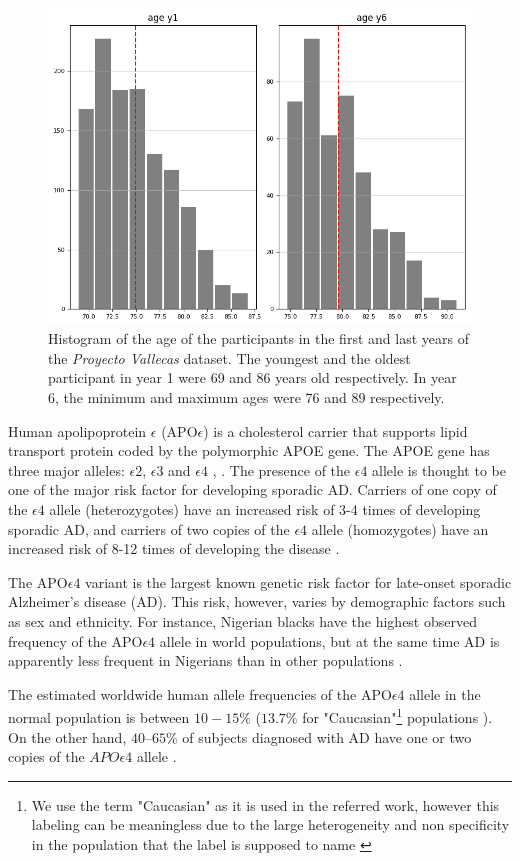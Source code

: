 \documentclass[11pt]{article}
\theoremstyle{definition}
\theoremstyle{remark}
\begin{document}
\begin{figure}[H]
        \centering
        \includegraphics[keepaspectratio, width=.6\linewidth]{figures/Fig_ages}
        \caption{Histogram of the age of the participants in the first and last years of the \emph{Proyecto Vallecas} dataset. The youngest and the oldest participant in year 1 were 69 and 86 years old respectively. In year 6, the minimum and maximum ages were 76 and 89 respectively.} 
        \label{fig:ages}
\end{figure}

Human apolipoprotein $\epsilon$ (APO$\epsilon$) is a cholesterol carrier that supports lipid transport protein coded by the polymorphic APOE gene. The APOE gene has three major alleles: $\epsilon2$, $\epsilon3$ and $\epsilon4$ \cite{mahley2000apolipoprotein}, \cite{hauser2011apolipoprotein}. The presence of the $\epsilon4$ allele is thought to be one of the major risk factor for developing sporadic AD. Carriers of one copy of the  $\epsilon4$ allele (heterozygotes) have an increased risk of 3-4 times of developing sporadic AD, and carriers of two copies of the $\epsilon4$ allele (homozygotes) have an increased risk of 8-12 times of developing the disease \cite{heffernan2016neurobiology}. 

The APO$\epsilon4$ variant is the largest known genetic risk factor for late-onset sporadic Alzheimer's disease (AD). This risk, however, varies by demographic factors such as sex and ethnicity. For instance, Nigerian blacks have the highest observed frequency of the APO$\epsilon4$ allele in world populations, but at the same time AD is apparently less frequent in Nigerians than in other populations \cite{sepehrnia1989genetic}.

The estimated worldwide human allele frequencies of the APO$\epsilon4$ allele in the normal population is between $10-15\%$\cite{myers1996apolipoprotein} ($13.7\%$ for "Caucasian"\footnote{We use the term "Caucasian" as it is used in the referred work, however this labeling can be meaningless due to the large heterogeneity and non specificity in the population that the label is supposed to name \cite{bhopal1998white}} populations \cite{corder1994protective}). 
On the other hand, $40–65\%$ of subjects diagnosed with AD have one or two copies of the $APO\epsilon4$ allele \cite{saunders1993association}. 
\end{document}
